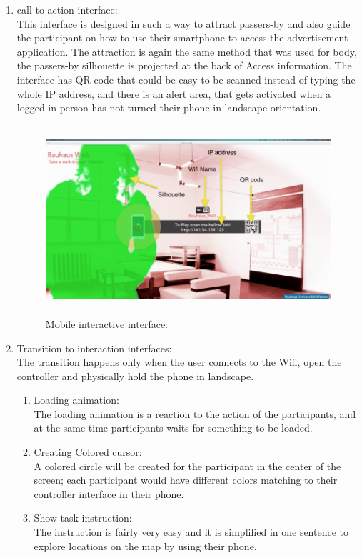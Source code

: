 \begin{enumerate}

\item call-to-action interface: \\
This interface is designed in such a way to attract passers-by and also guide the participant on how to use their smartphone to access the advertisement application. The attraction is again the same method that was used for body, the passers-by silhouette is projected at the back of Access information. The interface has QR code that could be easy to be scanned instead of typing the whole IP address, and there is an alert area, that gets activated when a logged in person has not turned their phone in landscape orientation.

\begin{figure}[H]
    \centering
    \includegraphics[width=120mm,height=70mm]{Figures/6/mobile/call-to-action}
    \caption{Mobile interactive interface:}%
    \label{fig:mobile_firstinterface}%
\end{figure}



\item Transition to interaction interfaces: \\
The transition happens only when the user connects to the Wifi, open the controller and physically hold the phone in landscape.

\begin{enumerate}
\item Loading animation:\\
  The loading animation is a reaction to the action of the participants, and at the same time participants waits for something to be loaded.
\item  Creating Colored cursor: \\
A colored circle will be created for the participant in the center of the screen; each participant would have different colors matching to their controller interface in their phone.
\item Show task instruction:  \\
The instruction is fairly very easy and it is simplified in one sentence to explore locations on the map by using their phone.


\end{enumerate}
\end{enumerate}
